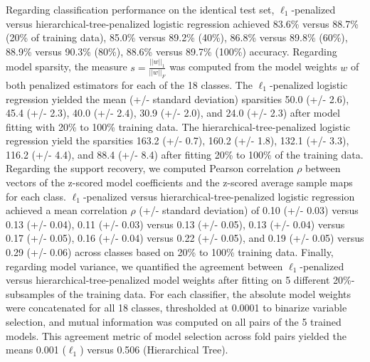 \documentclass{article}
\begin{document}
Regarding classification performance on the identical test set,
$\ell_1$-penalized versus hierarchical-tree-penalized logistic regression
achieved
83.6\% versus 88.7\% (20\% of training data),
85.0\% versus 89.2\% (40\%),
86.8\% versus 89.8\% (60\%),
88.9\% versus 90.3\% (80\%),
88.6\% versus 89.7\% (100\%) accuracy.
Regarding model sparsity,
the measure $s = \frac{||w||_1}{||w||_F}$ was computed from
the model weights $w$ of both penalized estimators
for each of the 18 classes.
The $\ell_1$-penalized logistic regression
yielded the mean (+/- standard deviation) sparsities
50.0 (+/- 2.6), 45.4 (+/- 2.3), 40.0 (+/- 2.4), 30.9 (+/- 2.0), and 24.0 (+/- 2.3)
after model fitting with 20\% to 100\% training data.
The hierarchical-tree-penalized logistic regression
yield the sparsities
163.2 (+/- 0.7), 160.2 (+/- 1.8), 132.1 (+/- 3.3), 116.2 (+/- 4.4), and 88.4 (+/- 8.4)
after fitting 20\% to 100\% of the training data.
Regarding the support recovery, we computed
Pearson correlation $\rho$ between vectors of
the z-scored model coefficients
and
the z-scored average sample maps for each class.
$\ell_1$-penalized versus hierarchical-tree-penalized logistic regression
achieved a mean correlation $\rho$ (+/- standard deviation) of
0.10 (+/- 0.03) versus 0.13 (+/- 0.04),
0.11 (+/- 0.03) versus 0.13 (+/- 0.05),
0.13 (+/- 0.04) versus 0.17 (+/- 0.05),
0.16 (+/- 0.04) versus 0.22 (+/- 0.05), and
0.19 (+/- 0.05) versus 0.29 (+/- 0.06) across classes
based on 20\% to 100\% training data.
Finally, regarding model variance,
we quantified the agreement between
$\ell_1$-penalized versus hierarchical-tree-penalized
model weights after fitting
on 5 different 20\%-subsamples of the training data.
For each classifier,
the absolute model weights were concatenated for all 18 classes,
thresholded at 0.0001 to binarize variable selection,
and mutual information was computed on all pairs
of the 5 trained models.
This agreement metric of model selection across fold pairs
yielded the means 0.001 ($\ell_1$) versus 0.506 (Hierarchical Tree).
\end{document}
